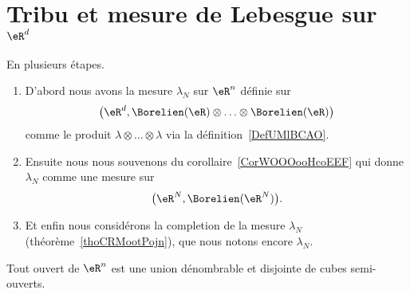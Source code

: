 \section{Tribu et mesure de Lebesgue sur \texorpdfstring{$ \eR^d$}{Rd}}

\begin{definition}      \label{DEFooSWJNooCSFeTF}
    En plusieurs étapes.
    \begin{enumerate}
        \item
            D'abord nous avons la mesure \( \lambda_N\) sur \( \eR^n\) définie sur
            \begin{equation}
                \big( \eR^d,\Borelien(\eR)\otimes\ldots\otimes\Borelien(\eR) \big)
            \end{equation}
            comme le produit \( \lambda\otimes\ldots\otimes \lambda\) via la définition~\ref{DefUMlBCAO}.
        \item
            Ensuite nous nous souvenons du corollaire~\ref{CorWOOOooHcoEEF} qui donne \( \lambda_N\) comme une mesure sur
            \begin{equation}
                \big( \eR^N,\Borelien(\eR^N) \big).
            \end{equation}
        \item
            Et enfin nous considérons la completion de la mesure \( \lambda_N\) (théorème~\ref{thoCRMootPojn}), que nous notons encore \( \lambda_N\).
    \end{enumerate}
\end{definition}

\begin{proposition}     \label{PropSKXGooRFHQst}
    Tout ouvert de \( \eR^n\) est une union dénombrable et disjointe de cubes semi-ouverts.
\end{proposition}


